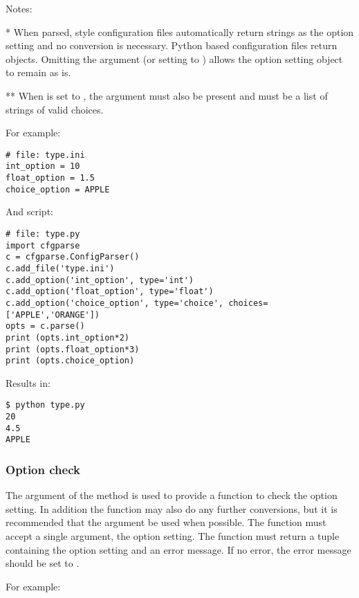 \documentclass{howto}
\begin{document}
Notes:

*   When parsed,  style configuration files automatically return
    strings as the option setting and no conversion is necessary.  Python
    based configuration files return objects.  Omitting the 
    argument (or setting  to ) allows the option setting 
    object to remain as is.    

**  When  is set to , the  argument
    must also be present and must be a list of strings of valid choices.

For example:

\begin{verbatim}
# file: type.ini
int_option = 10
float_option = 1.5
choice_option = APPLE 
\end{verbatim}

And script:

\begin{verbatim}
# file: type.py
import cfgparse
c = cfgparse.ConfigParser()
c.add_file('type.ini')
c.add_option('int_option', type='int')
c.add_option('float_option', type='float')
c.add_option('choice_option', type='choice', choices=['APPLE','ORANGE'])
opts = c.parse()
print (opts.int_option*2)
print (opts.float_option*3)
print (opts.choice_option)
\end{verbatim}

Results in:
\begin{verbatim}
$ python type.py
20
4.5
APPLE
\end{verbatim}
 
\subsubsection{Option check\label{cfgparse-option-check}}
 
The  argument of the  method is used to provide
a function to check the option setting.  In addition the function may also
do any further conversions, but it is recommended that the 
argument be used when possible.  The  function must accept a single
argument, the option setting.  The function must return a tuple containing
the option setting and an error message.  If no error, the error message 
should be set to .

For example:
\end{document}
